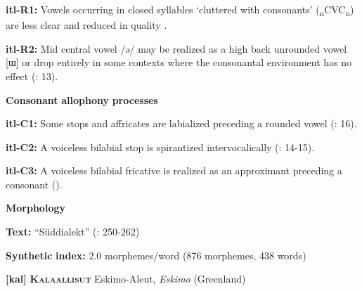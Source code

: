 \begin{styleBody}
\textbf{itl-R1:} Vowels occurring in closed syllables ‘cluttered with consonants’ (\textsubscript{n}CVC\textsubscript{n}) are less clear and reduced in quality \citep[73]{Volodin1976}.
\end{styleBody}

\begin{styleBody}
\textbf{itl-R2:} Mid central vowel /ə/ may be realized as a high back unrounded vowel [ɯ] or drop entirely in some contexts where the consonantal environment has no effect (\citealt{GeorgVolodin1999}: 13).
\end{styleBody}

\begin{styleBody}
\textbf{Consonant} \textbf{allophony} \textbf{processes}
\end{styleBody}

\begin{styleBody}
\textbf{itl-C1:} Some stops and affricates are labialized preceding a rounded vowel (\citealt{GeorgVolodin1999}: 16).
\end{styleBody}

\begin{styleBody}
\textbf{itl-C2:} A voiceless bilabial stop is spirantized intervocalically (\citealt{GeorgVolodin1999}: 14-15).
\end{styleBody}

\begin{styleBody}
\textbf{itl-C3:} A voiceless bilabial fricative is realized as an approximant preceding a consonant (\citealt{GeorgVolodin1999}).
\end{styleBody}

\begin{styleBody}
\textbf{Morphology}
\end{styleBody}

\begin{styleBody}
\textbf{Text:} “Süddialekt” (\citealt{GeorgVolodin1999}: 250-262)
\end{styleBody}

\begin{styleBody}
\textbf{Synthetic} \textbf{index:} 2.0 morphemes/word (876 morphemes, 438 words)
\end{styleBody}

\begin{styleBody}
\textbf{[kal]}   \textbf{\textsc{Kalaallisut}}    Eskimo-Aleut, \textit{Eskimo} (Greenland)
\end{styleBody}


